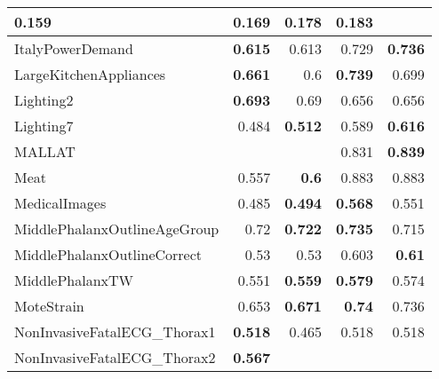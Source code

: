 \begin{longtable}{|l||r|r||r|r|}
0.159 &
\cellcolor[rgb]{ .973,  .796,  .678} \textbf{0.169} &
0.178 &
\cellcolor[rgb]{ .973,  .796,  .678} \textbf{0.183}
\bigstrut\\
\hline
ItalyPowerDemand &
\cellcolor[rgb]{ .973,  .796,  .678} \textbf{0.615} &
0.613 &
0.729 &
\cellcolor[rgb]{ .973,  .796,  .678} \textbf{0.736}
\bigstrut\\
\hline
\rowcolor[rgb]{ .851,  .851,  .851} LargeKitchenAppliances &
\cellcolor[rgb]{ .973,  .796,  .678} \textbf{0.661} &
0.6 &
\cellcolor[rgb]{ .973,  .796,  .678} \textbf{0.739} &
0.699
\bigstrut\\
\hline
Lighting2 &
\cellcolor[rgb]{ .973,  .796,  .678} \textbf{0.693} &
0.69 &
0.656 &
0.656
\bigstrut\\
\hline
\rowcolor[rgb]{ .851,  .851,  .851} Lighting7 &
0.484 &
\cellcolor[rgb]{ .973,  .796,  .678} \textbf{0.512} &
0.589 &
\cellcolor[rgb]{ .973,  .796,  .678} \textbf{0.616}
\bigstrut\\
\hline
MALLAT &
&
&
0.831 &
\cellcolor[rgb]{ .973,  .796,  .678} \textbf{0.839}
\bigstrut\\
\hline
\rowcolor[rgb]{ .851,  .851,  .851} Meat &
0.557 &
\cellcolor[rgb]{ .973,  .796,  .678} \textbf{0.6} &
0.883 &
0.883
\bigstrut\\
\hline
MedicalImages &
0.485 &
\cellcolor[rgb]{ .973,  .796,  .678} \textbf{0.494} &
\cellcolor[rgb]{ .973,  .796,  .678} \textbf{0.568} &
0.551
\bigstrut\\
\hline
\rowcolor[rgb]{ .851,  .851,  .851} MiddlePhalanxOutlineAgeGroup &
0.72 &
\cellcolor[rgb]{ .973,  .796,  .678} \textbf{0.722} &
\cellcolor[rgb]{ .973,  .796,  .678} \textbf{0.735} &
0.715
\bigstrut\\
\hline
MiddlePhalanxOutlineCorrect &
0.53 &
0.53 &
0.603 &
\cellcolor[rgb]{ .973,  .796,  .678} \textbf{0.61}
\bigstrut\\
\hline
\rowcolor[rgb]{ .851,  .851,  .851} MiddlePhalanxTW &
0.551 &
\cellcolor[rgb]{ .973,  .796,  .678} \textbf{0.559} &
\cellcolor[rgb]{ .973,  .796,  .678} \textbf{0.579} &
0.574
\bigstrut\\
\hline
MoteStrain &
0.653 &
\cellcolor[rgb]{ .973,  .796,  .678} \textbf{0.671} &
\cellcolor[rgb]{ .973,  .796,  .678} \textbf{0.74} &
0.736
\bigstrut\\
\hline
\rowcolor[rgb]{ .851,  .851,  .851} NonInvasiveFatalECG\_Thorax1 &
\cellcolor[rgb]{ .973,  .796,  .678} \textbf{0.518} &
0.465 &
0.518 &
0.518
\bigstrut\\
\hline
NonInvasiveFatalECG\_Thorax2 &
\cellcolor[rgb]{ .973,  .796,  .678} \textbf{0.567} &

\end{longtable}
